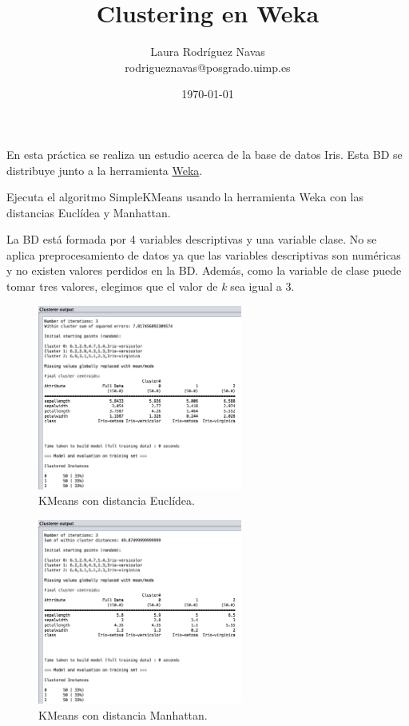 \documentclass[11pt]{exam}
\title{Clustering en Weka}
\author{Laura Rodríguez Navas \\ rodrigueznavas@posgrado.uimp.es}
\date{\today}
\begin{document}
	
\maketitle

En esta práctica se realiza un estudio acerca de la base de datos Iris. Esta BD se distribuye junto a la herramienta \href{https://www.cs.waikato.ac.nz/ml/weka/}{Weka}. 

\begin{questions}
	
{\question Ejecuta el algoritmo SimpleKMeans usando la herramienta Weka con las distancias Euclídea y Manhattan.}

La BD está formada por 4 variables descriptivas y una variable clase. No se aplica preprocesamiento de datos ya que las variables descriptivas son numéricas y no existen valores perdidos en la BD. Además, como la variable de clase puede tomar tres valores, elegimos que el valor de \textit{k} sea igual a 3.

\renewcommand{\figurename}{Figura}

\begin{figure}[h]
	\centering
	\includegraphics[width=0.6\textwidth]{kmeans_euclidea.png}
	\caption{KMeans con distancia Euclídea.}
	\label{Captura_1}
\end{figure}


\begin{figure}[h]
	\centering
	\includegraphics[width=0.6\textwidth]{kmeans_manhattan.png}
	\caption{KMeans con distancia Manhattan.}
	\label{Captura_2}
\end{figure}


\end{questions}
\end{document}
